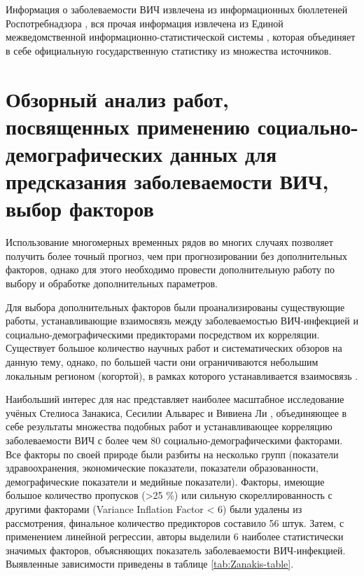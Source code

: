     Информация о заболеваемости ВИЧ извлечена из информационных бюллетеней Роспотребнадзора \cite{Информационные_бюллетени_Роспотребнадзор}, вся прочая информация извлечена из Единой межведомственной информационно-статистической системы \cite{ЕМИСС}, которая объединяет в себе официальную государственную статистику из множества источников. 


\section{Обзорный анализ работ, посвященных применению социально-демографических данных для предсказания заболеваемости ВИЧ, выбор факторов}
\linespread{1.5}
    Использование многомерных временных рядов во многих случаях позволяет получить более точный прогноз, чем при прогнозировании без дополнительных факторов, однако для этого необходимо провести дополнительную работу по выбору и обработке дополнительных параметров.

    Для выбора дополнительных факторов были проанализированы существующие работы, устанавливающие взаимосвязь между заболеваемостью ВИЧ-инфекцией и социально-демографическими предикторами посредством их корреляции. Существует большое количество научных работ и систематических обзоров на данную тему, однако, по большей части они ограничиваются небольшим локальным регионом (когортой), в рамках которого устанавливается взаимосвязь \cite{Ethiopia_Demographic_HIV, Ethiopia_Demographic_HIV_2, Dempgraphic_impact_of_HIV}. 
    
    Наибольший интерес для нас представляет наиболее масштабное исследование учёных Стелиоса Занакиса, Сесилии Альварес и Вивиена Ли \cite{Zanakis_Ortiz_socio_factors}, объединяющее в себе результаты множества подобных работ и устанавливающее корреляцию заболеваемости ВИЧ с более чем 80 социально-демографическими факторами. Все факторы по своей природе были разбиты на несколько групп (показатели здравоохранения, экономические показатели, показатели образованности, демографические показатели и медийные показатели). Факторы, имеющие большое количество пропусков (>25 \%) или сильную скореллированность с другими факторами (Variance Inflation Factor < 6) были удалены из рассмотрения, финальное количество предикторов составило 56 штук. Затем, с применением линейной регрессии, авторы выделили 6 наиболее статистически значимых факторов, объясняющих показатель заболеваемости ВИЧ-инфекцией. Выявленные зависимости приведены в таблице \ref{tab:Zanakis-table}.


